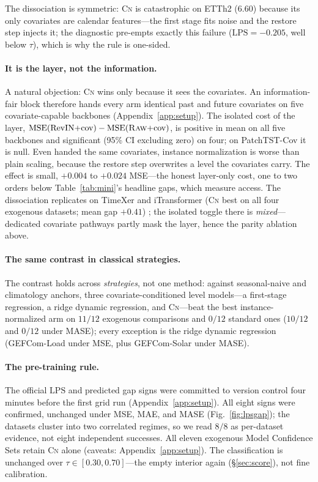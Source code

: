 \documentclass{article}
\newcommand{\lps}{\ensuremath{\mathrm{LPS}}}
\newcommand{\mse}{\ensuremath{\mathrm{MSE}}}
\newcommand{\rawm}{\textsc{Raw}}
\newcommand{\cnm}{\textsc{Cn}}
\begin{document}
The dissociation is symmetric: \cnm{} is catastrophic on ETTh2 ($6.60$) because
its only covariates are calendar features---the first stage fits noise and the
restore step injects it; the diagnostic pre-empts exactly this failure
($\lps=-0.205$, well below $\tau$), which is why the rule is one-sided.

\paragraph{It is the layer, not the information.} A natural objection: \cnm{}
wins only because it sees the covariates. An information-fair block therefore
hands every arm identical past and future covariates on five
covariate-capable backbones (Appendix~\ref{app:setup}). The isolated cost of the
layer, $\mse(\text{RevIN}{+}\text{cov}) - \mse(\rawm{+}\text{cov})$, is positive
in mean on all five backbones and significant (95\% CI excluding zero) on
four; on PatchTST-Cov it is null. Even handed the same covariates, instance
normalization is worse than plain scaling, because the restore step overwrites a
level the covariates carry. The effect is small, $+0.004$ to $+0.024$ MSE---the
honest layer-only cost, one to two orders below Table~\ref{tab:mini}'s headline
gaps, which measure access. The dissociation replicates on TimeXer and
iTransformer (\cnm{} best on all four exogenous datasets; mean gap $+0.41$)
\citep{wang2024timexer,liu2024itransformer}; the isolated toggle there is
\emph{mixed}---dedicated covariate pathways partly mask the layer, hence the
parity ablation above.

\paragraph{The same contrast in classical strategies.} The contrast holds
across \emph{strategies}, not one method: against seasonal-naive and climatology anchors,
three covariate-conditioned level models---a first-stage regression, a ridge
dynamic regression, and \cnm---beat the best instance-normalized arm on $11/12$
exogenous comparisons and $0/12$ standard ones ($10/12$ and $0/12$ under MASE);
every exception is the ridge dynamic regression (GEFCom-Load under MSE, plus
GEFCom-Solar under MASE).

\paragraph{The pre-training rule.} The official \lps{} and predicted gap signs
were committed to version control four minutes before the first grid run
(Appendix~\ref{app:setup}). All eight signs were confirmed, unchanged
under MSE, MAE, and MASE (Fig.~\ref{fig:lpsgap}); the datasets cluster into two
correlated regimes, so we read $8/8$ as per-dataset evidence, not eight
independent successes. All eleven exogenous Model Confidence Sets retain
\cnm{} alone (caveats: Appendix~\ref{app:setup}). The classification is
unchanged over $\tau\in[0.30,0.70]$---the empty interior again
(\S\ref{sec:score}), not fine calibration.
\end{document}
